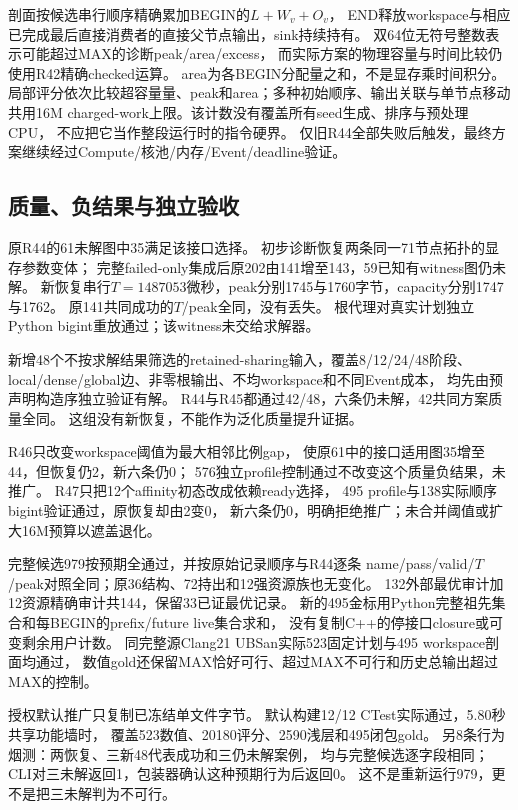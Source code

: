 \documentclass[UTF8,fontset=fandol,11pt]{ctexart}
\begin{document}
剖面按候选串行顺序精确累加BEGIN的\(L+W_v+O_v\)，
END释放workspace与相应已完成最后直接消费者的直接父节点输出，sink持续持有。
双64位无符号整数表示可能超过MAX的诊断peak/area/excess，
而实际方案的物理容量与时间比较仍使用R42精确checked运算。
area为各BEGIN分配量之和，不是显存乘时间积分。
局部评分依次比较超容量量、peak和area；多种初始顺序、输出关联与单节点移动
共用16M charged-work上限。该计数没有覆盖所有seed生成、排序与预处理CPU，
不应把它当作整段运行时的指令硬界。
仅旧R44全部失败后触发，最终方案继续经过Compute/核池/内存/Event/deadline验证。

\subsection{质量、负结果与独立验收}
原R44的61未解图中35满足该接口选择。
初步诊断恢复两条同一71节点拓扑的显存参数变体；
完整failed-only集成后原202由141增至143，59已知有witness图仍未解。
新恢复串行$T=1487053$微秒，peak分别1745与1760字节，capacity分别1747与1762。
原141共同成功的$T$/peak全同，没有丢失。
根代理对真实计划独立Python bigint重放通过；该witness未交给求解器。

新增48个不按求解结果筛选的retained-sharing输入，覆盖8/12/24/48阶段、
local/dense/global边、非零根输出、不均workspace和不同Event成本，
均先由预声明构造序独立验证有解。
R44与R45都通过42/48，六条仍未解，42共同方案质量全同。
这组没有新恢复，不能作为泛化质量提升证据。

R46只改变workspace阈值为最大相邻比例gap，
使原61中的接口适用图35增至44，但恢复仍2，新六条仍0；
576独立profile控制通过不改变这个质量负结果，未推广。
R47只把12个affinity初态改成依赖ready选择，
495 profile与138实际顺序bigint验证通过，原恢复却由2变0，
新六条仍0，明确拒绝推广；未合并阈值或扩大16M预算以遮盖退化。

完整候选979按预期全通过，并按原始记录顺序与R44逐条
name/pass/valid/$T$/peak对照全同；原36结构、72持出和12强资源族也无变化。
132外部最优审计加12资源精确审计共144，保留33已证最优记录。
新的495金标用Python完整祖先集合和每BEGIN的prefix/future live集合求和，
没有复制C++的停接口closure或可变剩余用户计数。
同完整源Clang21 UBSan实际523固定计划与495 workspace剖面均通过，
数值gold还保留MAX恰好可行、超过MAX不可行和历史总输出超过MAX的控制。

授权默认推广只复制已冻结单文件字节。
默认构建12/12 CTest实际通过，5.80秒共享功能墙时，
覆盖523数值、20180评分、2590浅层和495闭包gold。
另8条行为烟测：两恢复、三新48代表成功和三仍未解案例，
均与完整候选逐字段相同；CLI对三未解返回1，包装器确认这种预期行为后返回0。
这不是重新运行979，更不是把三未解判为不可行。
\end{document}
